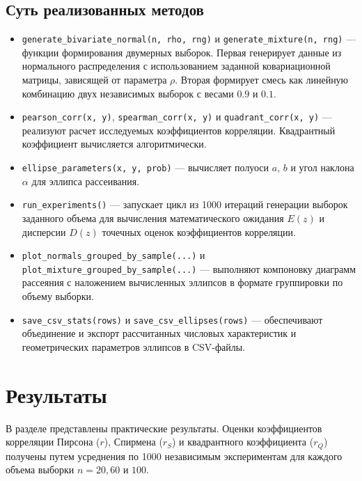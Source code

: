 \documentclass[a4paper, 14pt]{extarticle}
\begin{document}
\subsection{Суть реализованных методов}
\begin{itemize}
    \item \texttt{generate\_bivariate\_normal(n, rho, rng)} и \texttt{generate\_mixture(n, rng)} --- функции формирования двумерных выборок. Первая генерирует данные из нормального распределения с использованием заданной ковариационной матрицы, зависящей от параметра $\rho$. Вторая формирует смесь как линейную комбинацию двух независимых выборок с весами $0.9$ и $0.1$.
    \item \texttt{pearson\_corr(x, y)}, \texttt{spearman\_corr(x, y)} и \texttt{quadrant\_corr(x, y)} --- реализуют расчет исследуемых коэффициентов корреляции. Квадрантный коэффициент вычисляется алгоритмически.
    \item \texttt{ellipse\_parameters(x, y, prob)} --- вычисляет полуоси $a$, $b$ и угол наклона $\alpha$ для эллипса рассеивания.
    \item \texttt{run\_experiments()} --- запускает цикл из 1000 итераций генерации выборок заданного объема для вычисления математического ожидания $E(z)$ и дисперсии $D(z)$ точечных оценок коэффициентов корреляции.
    \item \texttt{plot\_normals\_grouped\_by\_sample(...)} и \\ \texttt{plot\_mixture\_grouped\_by\_sample(...)} --- выполняют компоновку диаграмм рассеяния с наложением вычисленных эллипсов в формате группировки по объему выборки.
    \item \texttt{save\_csv\_stats(rows)} и \texttt{save\_csv\_ellipses(rows)} --- обеспечивают объединение и экспорт рассчитанных числовых характеристик и геометрических параметров эллипсов в CSV-файлы.
\end{itemize}

\section{Результаты}

В разделе представлены практические результаты. Оценки коэффициентов корреляции Пирсона ($r$), Спирмена ($r_S$) и квадрантного коэффициента ($r_Q$) получены путем усреднения по 1000 независимым экспериментам для каждого объема выборки $n = 20, 60$ и $100$.
\end{document}
